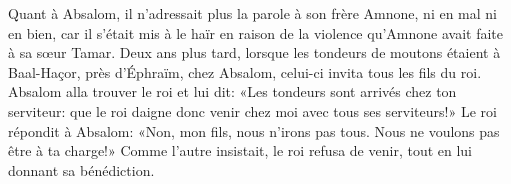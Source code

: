 Quant à Absalom, il n’adressait plus la parole à son frère Amnone, ni en mal ni en bien,
	car il s’était mis à le haïr
		en raison de la violence qu’Amnone avait faite à sa sœur Tamar.
Deux ans plus tard, lorsque les tondeurs de moutons étaient à Baal-Haçor,
	près d’Éphraïm, chez Absalom,
	celui-ci invita tous les fils du roi.
Absalom alla trouver le roi et lui dit:
	«Les tondeurs sont arrivés chez ton serviteur:
	que le roi daigne donc venir chez moi avec tous ses serviteurs!»
Le roi répondit à Absalom: «Non, mon fils, nous n’irons pas tous.
	Nous ne voulons pas être à ta charge!»
Comme l’autre insistait, le roi refusa de venir, tout en lui donnant sa bénédiction.
